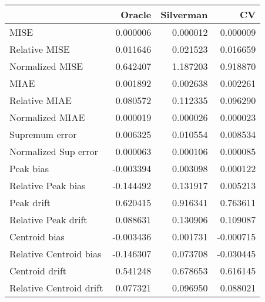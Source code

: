 \begin{tabular}{lrrr}
  \toprule
 & Oracle & Silverman & CV \\ 
  \midrule
MISE & 0.000006 & 0.000012 & 0.000009 \\ 
  Relative MISE & 0.011646 & 0.021523 & 0.016659 \\ 
  Normalized MISE & 0.642407 & 1.187203 & 0.918870 \\ 
  MIAE & 0.001892 & 0.002638 & 0.002261 \\ 
  Relative MIAE & 0.080572 & 0.112335 & 0.096290 \\ 
  Normalized MIAE & 0.000019 & 0.000026 & 0.000023 \\ 
  Supremum error & 0.006325 & 0.010554 & 0.008534 \\ 
  Normalized Sup error & 0.000063 & 0.000106 & 0.000085 \\ 
  Peak bias & -0.003394 & 0.003098 & 0.000122 \\ 
  Relative Peak bias & -0.144492 & 0.131917 & 0.005213 \\ 
  Peak drift & 0.620415 & 0.916341 & 0.763611 \\ 
  Relative Peak drift & 0.088631 & 0.130906 & 0.109087 \\ 
  Centroid bias & -0.003436 & 0.001731 & -0.000715 \\ 
  Relative Centroid bias & -0.146307 & 0.073708 & -0.030445 \\ 
  Centroid drift & 0.541248 & 0.678653 & 0.616145 \\ 
  Relative Centroid drift & 0.077321 & 0.096950 & 0.088021 \\ 
   \bottomrule
\end{tabular}
